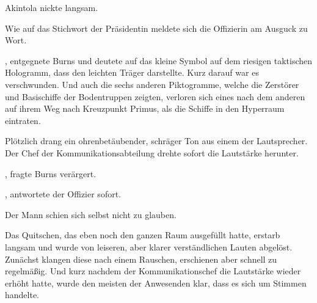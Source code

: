 \par

Akintola nickte langsam. 

\par

Wie auf das Stichwort der Präsidentin meldete sich die Offizierin am Ausguck zu Wort. 

\par

, entgegnete Burns und deutete auf das kleine Symbol auf dem riesigen taktischen Hologramm, dass den leichten Träger darstellte. Kurz darauf war es verschwunden. Und auch die sechs anderen Piktogramme, welche die Zerstörer und Basischiffe der Bodentruppen zeigten, verloren sich eines nach dem anderen auf ihrem Weg nach Kreuzpunkt Primus, als die Schiffe in den Hyperraum eintraten.

\par

Plötzlich drang ein ohrenbetäubender, schräger Ton aus einem der Lautsprecher. Der Chef der Kommunikationsabteilung drehte sofort die Lautstärke herunter.

\par

, fragte Burns verärgert.

\par

, antwortete der Offizier sofort. 

\par


\par

 Der Mann schien sich selbst nicht zu glauben. 

\par

Das Quitschen, das eben noch den ganzen Raum ausgefüllt hatte, erstarb langsam und wurde von leiseren, aber klarer verständlichen Lauten abgelöst. Zunächst klangen diese nach einem Rauschen, erschienen aber schnell zu regelmäßig. Und kurz nachdem der Kommunikationschef die Lautstärke wieder erhöht hatte, wurde den meisten der Anwesenden klar, dass es sich um Stimmen handelte.

